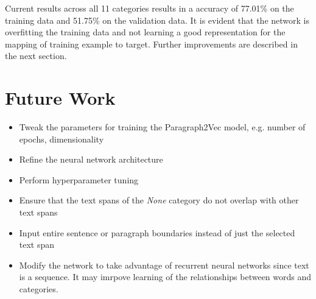 \documentclass[12pt, letterpaper]{article}
\begin{document}
Current results across all 11 categories results in a accuracy of 77.01\% on the training data and 51.75\% on the validation data. It is evident that the network is overfitting the training data and not learning a good representation for the mapping of training example to target. Further improvements are described in the next section.

\section{Future Work}
\begin{itemize}
\item Tweak the parameters for training the Paragraph2Vec model, e.g. number of epochs, dimensionality
\item Refine the neural network architecture
\item Perform hyperparameter tuning
\item Ensure that the text spans of the \textit{None} category do not overlap with other text spans
\item Input entire sentence or paragraph boundaries instead of just the selected text span
\item Modify the network to take advantage of recurrent neural networks since text is a sequence. It may imrpove learning of the relationships between words and categories.
\end{itemize}

\newpage

 
\end{document}
